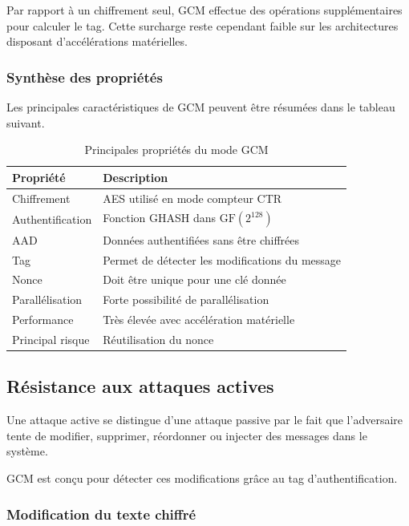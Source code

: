 \documentclass[12pt,a4paper]{article}
\begin{document}
Par rapport à un chiffrement seul, GCM effectue des opérations
supplémentaires pour calculer le tag. Cette surcharge reste cependant
faible sur les architectures disposant d'accélérations matérielles.

\subsubsection{Synthèse des propriétés}

Les principales caractéristiques de GCM peuvent être résumées dans
le tableau suivant.

\begin{table}[htbp]
\centering
\caption{Principales propriétés du mode GCM}
\label{tab:gcm_proprietes}
\begin{tabular}{p{4cm}p{8cm}}
\toprule
\textbf{Propriété} & \textbf{Description} \\
\midrule
Chiffrement & AES utilisé en mode compteur CTR \\
Authentification & Fonction GHASH dans $\mathrm{GF}(2^{128})$ \\
AAD & Données authentifiées sans être chiffrées \\
Tag & Permet de détecter les modifications du message \\
Nonce & Doit être unique pour une clé donnée \\
Parallélisation & Forte possibilité de parallélisation \\
Performance & Très élevée avec accélération matérielle \\
Principal risque & Réutilisation du nonce \\
\bottomrule
\end{tabular}
\end{table}

\subsection{Résistance aux attaques actives}
\label{subsec:gcm_attaques_actives}

Une attaque active se distingue d'une attaque passive par le fait que
l'adversaire tente de modifier, supprimer, réordonner ou injecter des
messages dans le système.

GCM est conçu pour détecter ces modifications grâce au tag
d'authentification.

\subsubsection{Modification du texte chiffré}
\end{document}
